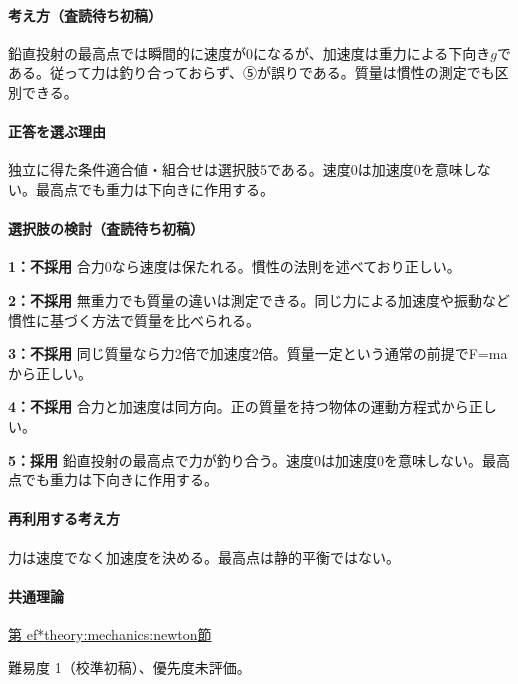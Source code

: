 \paragraph{考え方（査読待ち初稿）} 鉛直投射の最高点では瞬間的に速度が0になるが、加速度は重力による下向き\(g\)である。従って力は釣り合っておらず、⑤が誤りである。質量は慣性の測定でも区別できる。

\paragraph{正答を選ぶ理由} 独立に得た条件適合値・組合せは選択肢5である。速度0は加速度0を意味しない。最高点でも重力は下向きに作用する。

\paragraph{選択肢の検討（査読待ち初稿）}

\noindent\textbf{1：不採用} 合力0なら速度は保たれる。慣性の法則を述べており正しい。\par

\noindent\textbf{2：不採用} 無重力でも質量の違いは測定できる。同じ力による加速度や振動など慣性に基づく方法で質量を比べられる。\par

\noindent\textbf{3：不採用} 同じ質量なら力2倍で加速度2倍。質量一定という通常の前提でF=maから正しい。\par

\noindent\textbf{4：不採用} 合力と加速度は同方向。正の質量を持つ物体の運動方程式から正しい。\par

\noindent\textbf{5：採用} 鉛直投射の最高点で力が釣り合う。速度0は加速度0を意味しない。最高点でも重力は下向きに作用する。\par

\paragraph{再利用する考え方} 力は速度でなく加速度を決める。最高点は静的平衡ではない。

\paragraph{共通理論} \hyperref[theory:mechanics:newton]{第
ef*{theory:mechanics:newton}節}

\par 難易度 1（校準初稿）、優先度未評価。
